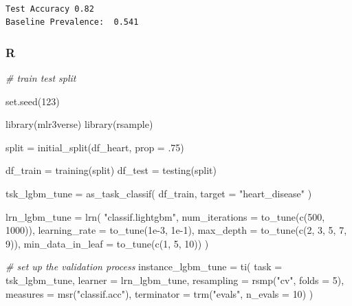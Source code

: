 \documentclass[
  letterpaper,
]{krantz}
\newenvironment{Shaded}{}{}
\newcommand{\AttributeTok}[1]{\textcolor[rgb]{0.49,0.56,0.16}{#1}}
\newcommand{\CommentTok}[1]{\textcolor[rgb]{0.38,0.63,0.69}{\textit{#1}}}
\newcommand{\DecValTok}[1]{\textcolor[rgb]{0.25,0.63,0.44}{#1}}
\newcommand{\FloatTok}[1]{\textcolor[rgb]{0.25,0.63,0.44}{#1}}
\newcommand{\FunctionTok}[1]{\textcolor[rgb]{0.02,0.16,0.49}{#1}}
\newcommand{\NormalTok}[1]{#1}
\newcommand{\OtherTok}[1]{\textcolor[rgb]{0.00,0.44,0.13}{#1}}
\newcommand{\StringTok}[1]{\textcolor[rgb]{0.25,0.44,0.63}{#1}}
\begin{document}
\begin{verbatim}

Test Accuracy 0.82 
Baseline Prevalence:  0.541
\end{verbatim}

\subsubsection{R}

\begin{Shaded}
\begin{Highlighting}[]
\CommentTok{\# train test split}

\FunctionTok{set.seed}\NormalTok{(}\DecValTok{123}\NormalTok{)}

\FunctionTok{library}\NormalTok{(mlr3verse)}
\FunctionTok{library}\NormalTok{(rsample)}

\NormalTok{split }\OtherTok{=} \FunctionTok{initial\_split}\NormalTok{(df\_heart, }\AttributeTok{prop =}\NormalTok{ .}\DecValTok{75}\NormalTok{)}

\NormalTok{df\_train }\OtherTok{=} \FunctionTok{training}\NormalTok{(split)}
\NormalTok{df\_test  }\OtherTok{=} \FunctionTok{testing}\NormalTok{(split)}

\NormalTok{tsk\_lgbm\_tune }\OtherTok{=} \FunctionTok{as\_task\_classif}\NormalTok{(}
\NormalTok{    df\_train,}
    \AttributeTok{target =} \StringTok{"heart\_disease"}
\NormalTok{)}

\NormalTok{lrn\_lgbm\_tune }\OtherTok{=} \FunctionTok{lrn}\NormalTok{(}
    \StringTok{"classif.lightgbm"}\NormalTok{,}
    \AttributeTok{num\_iterations =} \FunctionTok{to\_tune}\NormalTok{(}\FunctionTok{c}\NormalTok{(}\DecValTok{500}\NormalTok{, }\DecValTok{1000}\NormalTok{)),}
    \AttributeTok{learning\_rate =} \FunctionTok{to\_tune}\NormalTok{(}\FloatTok{1e{-}3}\NormalTok{, }\FloatTok{1e{-}1}\NormalTok{),}
    \AttributeTok{max\_depth =} \FunctionTok{to\_tune}\NormalTok{(}\FunctionTok{c}\NormalTok{(}\DecValTok{2}\NormalTok{, }\DecValTok{3}\NormalTok{, }\DecValTok{5}\NormalTok{, }\DecValTok{7}\NormalTok{, }\DecValTok{9}\NormalTok{)),}
    \AttributeTok{min\_data\_in\_leaf =} \FunctionTok{to\_tune}\NormalTok{(}\FunctionTok{c}\NormalTok{(}\DecValTok{1}\NormalTok{, }\DecValTok{5}\NormalTok{, }\DecValTok{10}\NormalTok{))}
\NormalTok{)}

\CommentTok{\# set up the validation process}
\NormalTok{instance\_lgbm\_tune }\OtherTok{=} \FunctionTok{ti}\NormalTok{(}
    \AttributeTok{task =}\NormalTok{ tsk\_lgbm\_tune,}
    \AttributeTok{learner =}\NormalTok{ lrn\_lgbm\_tune,}
    \AttributeTok{resampling =} \FunctionTok{rsmp}\NormalTok{(}\StringTok{"cv"}\NormalTok{, }\AttributeTok{folds =} \DecValTok{5}\NormalTok{),}
    \AttributeTok{measures =} \FunctionTok{msr}\NormalTok{(}\StringTok{"classif.acc"}\NormalTok{),}
    \AttributeTok{terminator =} \FunctionTok{trm}\NormalTok{(}\StringTok{"evals"}\NormalTok{, }\AttributeTok{n\_evals =} \DecValTok{10}\NormalTok{)}
\NormalTok{)}


\end{Highlighting}
\end{Shaded}
\end{document}
